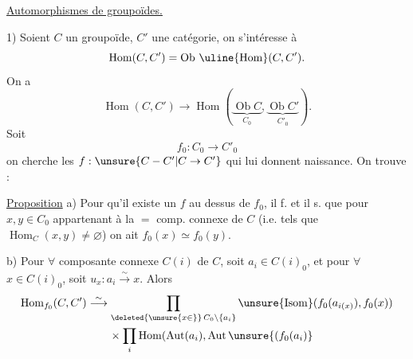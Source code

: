 \uline{Automorphismes de groupoïdes.}

1) Soient $C$  un groupoïde,
$C'$ une catégorie, on s'intéresse à
\[
\operatorname{Hom}(C,C')=\operatorname{Ob}\,\uline{\operatorname{Hom}}(C,C').
\]
On a
\[
\operatorname{Hom}(C,C')\longrightarrow
\operatorname{Hom}(\underbrace{\operatorname{Ob}C}_{C_0},\underbrace{\operatorname{Ob}C'}_{C'_0}).
\]
Soit
\[ f_0:C_0\longrightarrow C'_0 \]
on cherche les $f:\unsure{C-C'|C\to C'}$ qui lui donnent naissance. On trouve :

\uline{Proposition} a) Pour qu'il existe un $f$ au dessus de $f_0$, il f. et il s.
que pour $x,y\in C_0$ appartenant à la $=$ comp. connexe de $C$
(i.e. tels que $\operatorname{Hom}_C(x,y)\ne\varnothing$) on ait
$f_0(x)\simeq f_0(y)$.

b) Pour $\forall$ composante connexe $C(i)$ de $C$, soit $a_i\in C(i)_0$,
et pour $\forall$ $x\in C(i)_0$, soit
$u_x:a_i\overset{\sim}{\longrightarrow}x$. Alors
\[
\begin{aligned}
\operatorname{Hom}_{f_0}(C,C')&\overset{\sim}{\longrightarrow}
\prod_{\deleted{\unsure{x\in}}\,C_0\setminus\{a_i\}}
\unsure{\operatorname{Isom}}(f_0(a_{i(x)}),f_0(x))\\
&\qquad\times\prod_i\operatorname{Hom}(\operatorname{Aut}(a_i),\operatorname{Aut}\unsure{(f_0(a_i)}
\end{aligned}
\]
